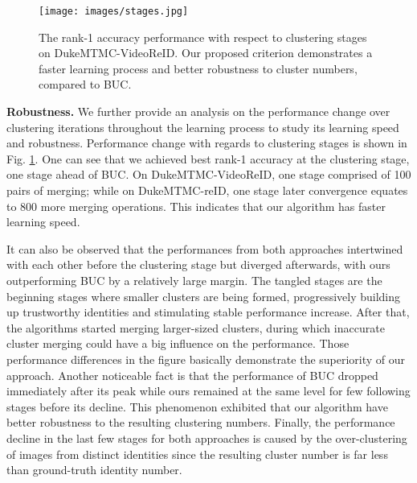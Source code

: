 \documentclass[journal]{IEEEtran}
\begin{document}
\begin{figure}[htb]
\begin{center}
    \centering
    \texttt{[image: images/stages.jpg]}
    \caption{The rank-1 accuracy performance with respect to clustering stages on DukeMTMC-VideoReID. Our proposed criterion demonstrates a faster learning process and better robustness to cluster numbers, compared to BUC\cite{lin2019bottom}.}
    \label{fig:stages}
    \end{center}
\end{figure} \textbf{Robustness.}
We further provide an analysis on the performance change over clustering iterations throughout the learning process to study its learning speed and robustness. Performance change with regards to clustering stages is shown in Fig. \ref{fig:stages}. One can see that we achieved best rank-1 accuracy at the  clustering stage, one stage ahead of BUC. On DukeMTMC-VideoReID, one stage comprised of 100 pairs of merging; while on DukeMTMC-reID, one stage later convergence equates to 800 more merging operations. This indicates that our algorithm has faster learning speed.


It can also be observed that the performances from both approaches  intertwined with each other before the  clustering stage but diverged afterwards, with ours outperforming BUC by a relatively large margin. The tangled stages are the beginning stages where smaller clusters are being formed, progressively building up trustworthy identities and stimulating stable performance increase. After that, the algorithms started merging larger-sized clusters, during which inaccurate cluster merging could have a big influence on the performance. Those performance differences in the figure basically demonstrate the superiority of our approach. Another noticeable fact is that the performance of BUC dropped immediately after its peak while ours remained at the same level for few following stages before its decline. This phenomenon exhibited that our algorithm have better robustness to the resulting clustering numbers. Finally, the performance decline in the last few stages for both approaches is caused by the over-clustering of images from distinct identities since the resulting cluster number is far less than ground-truth identity number.
\end{document}
